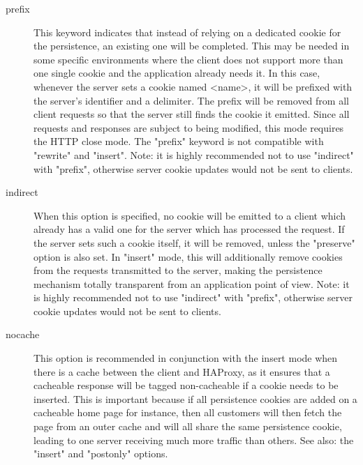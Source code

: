 \begin{description}
  \item[prefix]
              This keyword indicates that instead of relying on a dedicated
              cookie for the persistence, an existing one will be completed.
              This may be needed in some specific environments where the client
              does not support more than one single cookie and the application
              already needs it. In this case, whenever the server sets a cookie
              named <name>, it will be prefixed with the server's identifier
              and a delimiter. The prefix will be removed from all client
              requests so that the server still finds the cookie it emitted.
              Since all requests and responses are subject to being modified,
              this mode requires the HTTP close mode. The "prefix" keyword is
              not compatible with "rewrite" and "insert". Note: it is highly
              recommended not to use "indirect" with "prefix", otherwise server
              cookie updates would not be sent to clients.

  \item[indirect]
              When this option is specified, no cookie will be emitted to a
              client which already has a valid one for the server which has
              processed the request. If the server sets such a cookie itself,
              it will be removed, unless the "preserve" option is also set. In
              "insert" mode, this will additionally remove cookies from the
              requests transmitted to the server, making the persistence
              mechanism totally transparent from an application point of view.
              Note: it is highly recommended not to use "indirect" with
              "prefix", otherwise server cookie updates would not be sent to
              clients.

  \item[nocache]
              This option is recommended in conjunction with the insert mode
              when there is a cache between the client and HAProxy, as it
              ensures that a cacheable response will be tagged non-cacheable if
              a cookie needs to be inserted. This is important because if all
              persistence cookies are added on a cacheable home page for
              instance, then all customers will then fetch the page from an
              outer cache and will all share the same persistence cookie,
              leading to one server receiving much more traffic than others.
              See also: the "insert" and "postonly" options.


\end{description}
